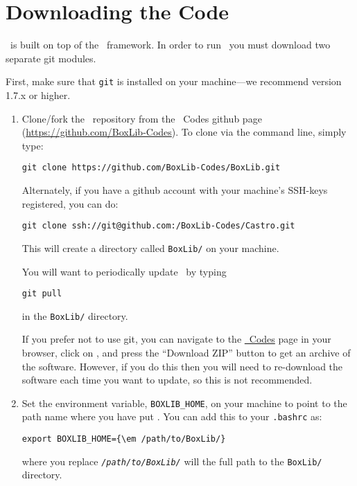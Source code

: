 
\section{Downloading the Code}

\castro\ is built on top of the \boxlib\ framework.  In order to run
\castro\, you must download two separate git modules.

\vspace{.1in}

\noindent First, make sure that {\tt git} is installed on your machine---we recommend version 1.7.x or higher.

\vspace{.1in}

\begin{enumerate}

\item Clone/fork the \boxlib\ repository from the \boxlib\ Codes {\sf
  github} page (\url{https://github.com/BoxLib-Codes}).  To
  clone via the command line, simply type:
\begin{verbatim}
git clone https://github.com/BoxLib-Codes/BoxLib.git
\end{verbatim}
Alternately, if you have a {\sf github} account with your
machine's SSH-keys registered, you can do:
\begin{verbatim}
git clone ssh://git@github.com:/BoxLib-Codes/Castro.git
\end{verbatim}

This will create a directory called {\tt BoxLib/} on your machine.

You will want to periodically update \boxlib\ by typing
\begin{verbatim}
git pull
\end{verbatim}
in the {\tt BoxLib/} directory.  

If you prefer not to use {\sf git}, you can navigate to the
\href{https://github.com/BoxLib-Codes}{\boxlib\ Codes} page in
your browser, click on \boxlib, and press the ``Download ZIP''
button to get an archive of the software. However, if you do this
then you will need to re-download the software each time you want to
update, so this is not recommended.

\item Set the environment variable, {\tt BOXLIB\_HOME}, on your
  machine to point to the path name where you have put \boxlib.
  You can add this to your {\tt .bashrc} as:
\begin{Verbatim}[commandchars=\\\{\}]
export BOXLIB_HOME={\em /path/to/BoxLib/}
\end{Verbatim}
where you replace \texttt{\em /path/to/BoxLib/} will the full path to the
{\tt BoxLib/} directory.


\end{enumerate}
